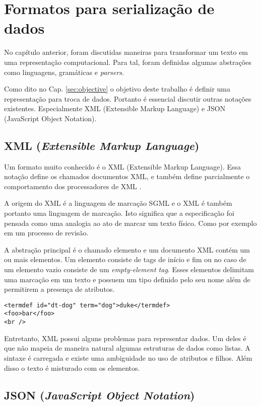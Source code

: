 \chapter{Formatos para serialização de dados}

No capítulo anterior, foram discutidas maneiras para transformar um texto 
em uma representação computacional. Para tal, foram definidas algumas abstrações
como linguagens, gramáticas e \textit{parsers}.

Como dito no Cap. \ref{sec:objective} o objetivo deste trabalho é definir
uma representação para troca de dados. Portanto é essencial discutir outras
notações existentes. Especialmente XML (Extensible Markup Language) e 
JSON (JavaScript Object Notation).

\section{XML (\textit{Extensible Markup Language})}

Um formato muito conhecido é o XML (Extensible Markup Language). 
Essa notação define os chamados documentos XML, e também define parcialmente o comportamento 
dos processadores de XML \cite{XML}. 

A origem do XML é a linguagem de marcação SGML e o XML é também portanto uma linguagem de marcação.
Isto significa que a especificação foi pensada como uma analogia ao ato de marcar um texto físico.
Como por exemplo em um processo de revisão.

A abstração principal é o chamado elemento e um documento XML contém um ou mais elementos. 
Um elemento consiste de tags de início e fim ou no caso de um elemento vazio 
consiste de um \textit{empty-element tag}. Esses elementos delimitam uma marcação
em um texto e possuem um tipo definido pelo seu nome além de permitirem a presença de atributos. 

\begin{lstlisting}[caption=Exemplo de elementos XML,label={lst:xmlelement}]
<termdef id="dt-dog" term="dog">duke</termdef>
<foo>bar</foo>
<br />
\end{lstlisting}

Entretanto, XML possui alguns problemas para representar dados. Um deles é
que não mapeia de maneira natural algumas estruturas de dados como listas. A sintaxe é
carregada e existe uma ambiguidade no uso de atributos e filhos. Além disso o texto 
é misturado com os elementos.

\section{JSON (\textit{JavaScript Object Notation})}

